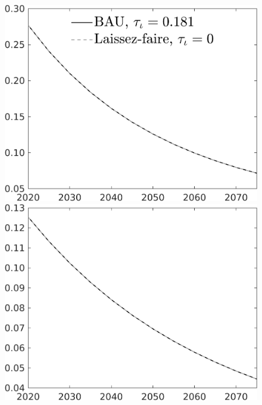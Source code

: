 \documentclass[12pt]{article}
\begin{document}
\begin{figure}[h!!]
\begin{minipage}[]{0.32\textwidth}
		\end{minipage}
	\begin{minipage}[]{0.32\textwidth}
		\includegraphics[width=1\textwidth]{../../codding_model/own_basedOnFried/optimalPol_010922_revision/figures/all_13Sept22/CompTaul_LFBAU_Reg0_pf_spillover0_nsk1_xgr0_knspil1_sep1_countec0_GovRev0_etaa0.79_lgd1.png}
	\end{minipage}	
	\begin{minipage}[]{0.32\textwidth}
		\includegraphics[width=1\textwidth]{../../codding_model/own_basedOnFried/optimalPol_010922_revision/figures/all_13Sept22/CompTaul_LFBAU_Reg0_pee_spillover0_nsk1_xgr0_knspil1_sep1_countec0_GovRev0_etaa0.79_lgd0.png}

\end{minipage}
\end{figure}
\end{document}
